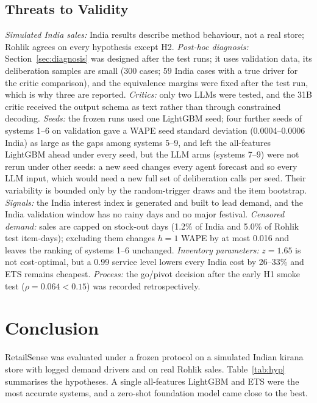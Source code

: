 \documentclass[conference]{IEEEtran}
\begin{document}
\subsection{Threats to Validity}\label{sec:threats}
\emph{Simulated India sales:} India results describe method behaviour, not a real store; Rohlik
agrees on every hypothesis except H2. \emph{Post-hoc diagnosis:} Section~\ref{sec:diagnosis} was
designed after the test runs; it uses validation data, its deliberation samples are small (300
cases; 59 India cases with a true driver for the critic comparison), and the equivalence margins were
fixed after the test run, which is why three are reported. \emph{Critics:} only two LLMs were tested,
and the 31B critic received the output schema as text rather than through constrained decoding.
\emph{Seeds:} the frozen runs used one LightGBM seed; four further seeds of systems 1--6 on
validation gave a WAPE seed standard deviation (0.0004--0.0006 India) as large as the gaps among
systems 5--9, and left the all-features LightGBM ahead under every seed,
but the LLM arms (systems 7--9) were not rerun under other seeds: a new seed changes every agent
forecast and so every LLM input, which would need a new full set of deliberation calls per seed.
Their variability is bounded only by the random-trigger draws and the item bootstrap. \emph{Signals:} the India interest index is
generated and built to lead demand, and the India validation window has no rainy days and no major
festival. \emph{Censored demand:} sales are capped on stock-out days (1.2\% of India and 5.0\% of
Rohlik test item-days); excluding them changes $h=1$ WAPE by at most 0.016 and leaves the ranking of
systems 1--6 unchanged. \emph{Inventory parameters:} $z=1.65$ is not cost-optimal, but a 0.99 service
level lowers every India cost by 26--33\% and ETS remains cheapest. \emph{Process:} the go/pivot
decision after the early H1 smoke test ($\rho=0.064<0.15$) was recorded retrospectively.

\section{Conclusion}\label{sec:conclusion}

RetailSense was evaluated under a frozen protocol on a simulated Indian kirana store with logged
demand drivers and on real Rohlik sales. Table~\ref{tab:hyp} summarises the hypotheses. A single
all-features LightGBM and ETS were the most accurate systems, and a zero-shot foundation model came
close to the best.
\end{document}
